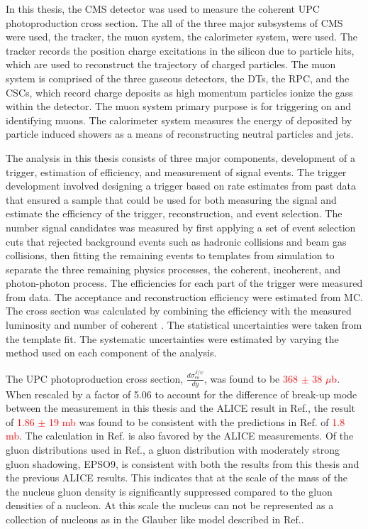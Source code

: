   In this thesis, the CMS detector was used to measure the coherent UPC \JPsi{} 
    photoproduction cross section.
  The all of the three  major subsystems of CMS were used, the tracker, 
    the muon system, the calorimeter system, were used.
  The tracker records the position charge excitations in the silicon due to 
    particle hits, which are used to reconstruct the trajectory of charged 
    particles. 
  The muon system is comprised of the three gaseous detectors, the DTs, the 
    RPC, and the CSCs, which record charge deposits as high momentum particles
    ionize the gass within the detector.
  The muon system primary purpose is for triggering on and identifying muons.
  The calorimeter system measures the energy of deposited by particle induced
    showers as a means of reconstructing neutral particles and jets.
  
  The analysis in this thesis consists of three major components, development
    of a trigger, estimation of efficiency, and measurement of signal events.
  The trigger development involved designing a trigger based on rate estimates
    from past data that ensured a sample that could be used for both measuring
    the signal and estimate the efficiency of the trigger, reconstruction, and
    event selection.
  The number signal \JPsi{} candidates was measured by first applying a set 
    of event selection cuts that rejected background events such as hadronic
    collisions and beam gas collisions, then fitting the remaining events to
    templates from simulation to separate the three remaining physics processes,
    the coherent, incoherent, and photon-photon process.
  The efficiencies for each part of the trigger were measured from data. 
  The acceptance and reconstruction efficiency were estimated from MC.
  The cross section was calculated by combining the efficiency with the 
    measured luminosity and number of coherent \JPsi{}.
  The statistical uncertainties were taken from the template fit.
  The systematic uncertainties were estimated by varying the method used on 
    each component of the analysis. 

  The UPC \JPsi{} photoproduction cross section, $\frac{d\sigma^{J/\psi}_{co}}{dy}$,
    was found to be \textcolor{red}{368 $\pm$ 38 $\mu$b}. 
  When rescaled by a factor of 5.06 to account for the difference of break-up mode between 
    the measurement in this thesis and the ALICE result in Ref.\cite{alice2012.09}, the 
    result of \textcolor{red}{1.86 $\pm$ 19 mb} was found to be consistent with the 
    predictions in Ref.\cite{pQCD2013.02} of \textcolor{red}{1.8 mb}.  
  The calculation in Ref.\cite{pQCD2013.02} is also favored by the ALICE measurements. 
  Of the gluon distributions used in Ref.\cite{pQCD2013.02}, a gluon distribution with 
    moderately strong gluon shadowing, EPSO9, is consistent with both the results from this
    thesis and the previous ALICE results. 
  This indicates that at the scale of the mass of the \JPsi{} the nucleus gluon density is 
    significantly suppressed compared to the gluon densities of a nucleon.
  At this scale the nucleus can not be represented as a collection of nucleons as in the 
    Glauber like model described in Ref.\cite{vmd1999}.

